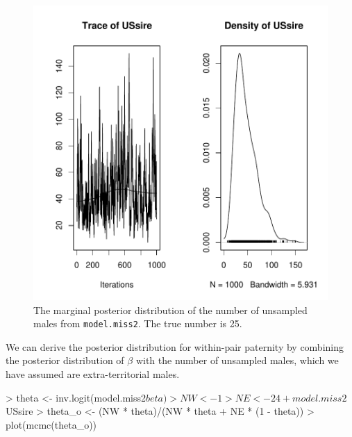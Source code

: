 \documentclass{article}
\begin{document}
\begin{figure}[!h]
\begin{center}
\includegraphics{Tutorial-078}
\end{center}
\caption{The marginal posterior distribution of the number of unsampled males from \texttt{model.miss2}.  The true number is 25.}
\label{model.miss2US-fig}
\end{figure}

We can derive the posterior distribution for within-pair paternity by combining the posterior distribution of $\beta$ with the number of unsampled males, which we have assumed are extra-territorial males.

\begin{Schunk}
\begin{Sinput}
> theta <- inv.logit(model.miss2$beta)
> NW <- 1
> NE <- 24 + model.miss2$USsire
> theta_o <- (NW * theta)/(NW * theta + NE * (1 - theta))
> plot(mcmc(theta_o))
\end{Sinput}
\end{Schunk}
\end{document}
